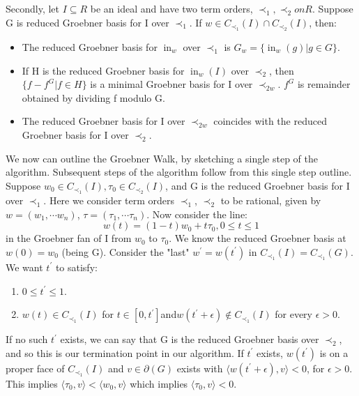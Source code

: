 \documentclass[12pt,a4paper]{report}
\DeclareMathOperator{\initial}{in}
\begin{document}
Secondly, let $I \subseteq R$ be an ideal and have two term orders, $\prec_{1}, \prec_{2} on R$. Suppose G is reduced Groebner basis for I over $\prec_{1}$. If $w \in C_{\prec_{1}} (I) \cap C_{\prec_{2}} (I)$, then:

\begin{itemize}
    \item The reduced Groebner basis for $\initial_{w}$ over $\prec_{1}$ is $G_{w} = \{ \initial_{w} (g) | g \in G\}$.
    \item If H is the reduced Groebner basis for $\initial_{w} (I)$ over $\prec_{2}$, then $\{ f - f^{G} | f \in H \}$ is a minimal Groebner basis for I over $\prec_{2w}$. $f^{G}$ is remainder obtained by dividing f modulo G.
    \item The reduced Groebner basis for I over $\prec_{2w}$ coincides with the reduced Groebner basis for I over $\prec_{2}$.
\end{itemize}

We now can outline the Groebner Walk, by sketching a single step of the algorithm. Subsequent steps of the algorithm follow from this single step outline. Suppose $w_{0} \in C_{{\prec}_{1}} (I), \tau_{0} \in C_{{\prec}_{2}} (I)$, and G is the reduced Groebner basis for I over $\prec_{1}$. Here we consider term orders $\prec_{1}$, $\prec_{2}$ to be rational, given by $w = (w_{1}, \cdots w_{n})$, $\tau = (\tau_{1}, \cdots \tau_{n})$. Now consider the line:
\begin{equation*}
    w(t) = (1-t)w_{0} + t \tau_{0}, 0 \leq t \leq 1
\end{equation*}
in the Groebner fan of I from $w_{0}$ to $\tau_{0}$. We know the reduced Groebner basis at $w(0) = w_{0}$ (being G). Consider the "last" $w^{'} = w(t^{'})$ in $C_{{\prec}_{1}} (I) = C_{{\prec}_{1}} (G)$. We want $t^{'}$ to satisfy:

\begin{enumerate}
    \item $0 \leq t^{'} \leq 1$.
    \item $w(t) \in C_{\prec}_{1} (I)$ for $t \in [0, t^{'}] $and$ w(t^{'} + \epsilon) \notin C_{\prec}_{1} (I)$ for every $\epsilon > 0$.
\end{enumerate}

If no such $t^{'}$ exists, we can say that G is the reduced Groebner basis over $\prec_{2}$, and so this is our termination point in our algorithm. If $t^{'}$ exists, $w(t^{'})$ is on a proper face of $C_{{\prec}_{1}} (I)$ and $v \in \partial (G)$ exists with $\langle w (t^{'} + \epsilon), v \rangle < 0$, for $\epsilon > 0$. This implies $\langle \tau_{0}, v \rangle < \langle w_{0}, v \rangle$ which implies $\langle \tau_{0}, v \rangle < 0$.
\end{document}
